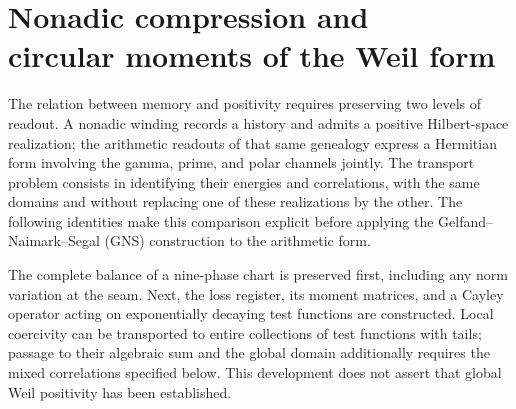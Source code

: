 \clearpage
\section[Nonadic compression and circular moments of the Weil form]{Nonadic compression and\\circular moments of the Weil form}
\label{sec:transporte-momentos}
\label{tm-add-seccion}

The relation between memory and positivity requires preserving two levels of readout.
A nonadic winding records a history and admits a positive Hilbert-space
realization; the arithmetic readouts of that same genealogy express a Hermitian
form involving the gamma, prime, and polar channels jointly.
The transport problem consists in identifying their energies and correlations,
with the same domains and without replacing one of these realizations by the other.
The following identities make this comparison explicit before applying
the Gelfand--Naimark--Segal (GNS) construction to the arithmetic form.

The complete balance of a nine-phase chart is preserved first, including
any norm variation at the seam. Next, the loss register,
its moment matrices, and a Cayley operator acting on exponentially
decaying test functions are constructed. Local coercivity can be transported
to entire collections of test functions with tails; passage to their algebraic sum and the global
domain additionally requires the mixed correlations specified below.
This development does not assert that global Weil positivity has been established.

% 
% 
% 
%

